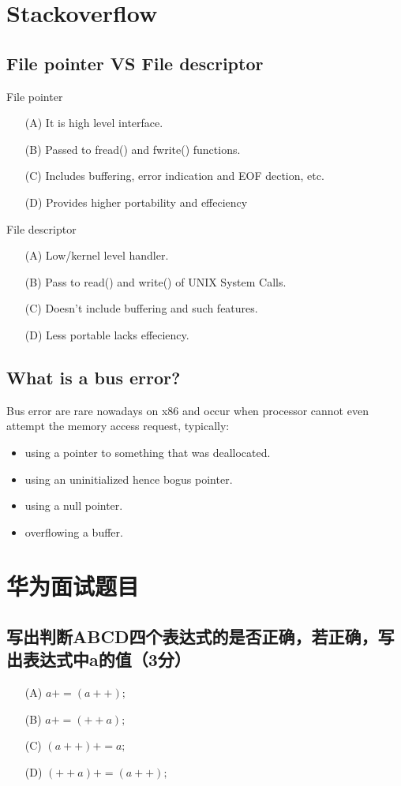 \documentclass{article}
\begin{document}
\section{Stackoverflow}
\subsection{File pointer VS File descriptor}
\textsf{File pointer}
\begin{itemize}
\item[(A)] It is high level interface.
\item[(B)] Passed to fread() and fwrite() functions.
\item[(C)] Includes buffering, error indication and EOF dection, etc.
\item[(D)] Provides higher portability and effeciency
\end{itemize}

\textsf{File descriptor}
\begin{itemize}
\item[(A)] Low/kernel level handler.
\item[(B)] Pass to read() and write() of UNIX System Calls.
\item[(C)] Doesn't include buffering and such features.
\item[(D)] Less portable lacks effeciency.
\end{itemize}


\subsection{What is a bus error?}
Bus error are rare nowadays on x86 and occur when processor cannot even 
attempt the memory access request, typically:
\begin{itemize}
\item using a pointer to something that was deallocated.
\item using an uninitialized hence bogus pointer.
\item using a null pointer.
\item overflowing a buffer.
\end{itemize}
\section{华为面试题目}
\subsection{写出判断ABCD四个表达式的是否正确，若正确，写出表达式中a的值（3分）}
\begin{itemize}
\item[(A)] $a += (a++);$
\item[(B)] $a += (++a);$
\item[(C)] $(a++) += a;$
\item[(D)] $(++a) += (a++);$
\end{itemize}
\end{document}
